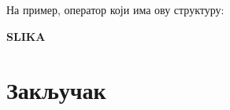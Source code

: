 \documentclass[a4paper]{article}
\begin{document}
На пример, оператор који има ову структуру:

\textbf{SLIKA}







% 
% 


\section{Закључак}
\label{sec:zakljucak}
\end{document}
